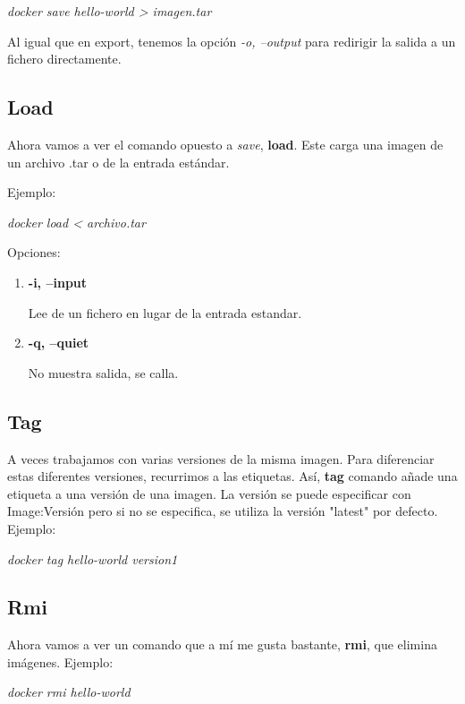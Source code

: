 \documentclass[]{article}
\begin{document}
\begin{center}
	\it
	docker save hello-world > imagen.tar
\end{center}

Al igual que en export, tenemos la opción \textit{-o, --output} para redirigir la salida a un fichero directamente.


\subsection{Load}
Ahora vamos a ver el comando opuesto a \textit{save}, \textbf{load}.
Este carga una imagen de un archivo .tar o de la entrada estándar.

Ejemplo:

\begin{center}
	\it
	docker load < archivo.tar
\end{center}

Opciones:

\begin{enumerate}
\renewcommand{\labelenumi}{$\bullet$}
\item \textbf{-i, --input}

Lee de un fichero en lugar de la entrada estandar.
\item \textbf{-q, --quiet}

No muestra salida, se calla.
\end{enumerate}


\subsection{Tag}

A veces trabajamos con varias versiones de la misma imagen.
Para diferenciar estas diferentes versiones, recurrimos a las etiquetas.
Así, \textbf{tag} comando añade una etiqueta a una versión de una imagen.
La versión se puede especificar con Image:Versión pero si no se especifica, se utiliza la versión "latest" por defecto.
Ejemplo:

\begin{center}
\it
docker tag hello-world version1
\end{center}

\subsection{Rmi}
Ahora vamos a ver un comando que a mí me gusta bastante, \textbf{rmi}, que elimina imágenes.
Ejemplo:

\begin{center}
	\it
	docker rmi hello-world
\end{center}
\end{document}
